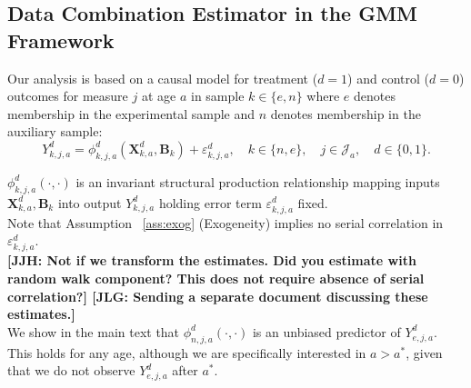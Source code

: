


\usepackage[stable]{footmisc}

\newcommand*\leftright[2]{%
  \leavevmode
  \rlap{#1}%
  \hspace{0.5\linewidth}%
  #2}

\newcommand{\orth}{\ensuremath{\perp\!\!\!\perp}}%
\newcommand{\indep}{\orth}%
\newcommand{\notorth}{\ensuremath{\perp\!\!\!\!\!\!\diagup\!\!\!\!\!\!\perp}}%
\newcommand{\notindep}{\notorth}







\doublespacing

\subsection{Data Combination Estimator in the GMM Framework} \label{appendix:gmm}

\noindent Our analysis is based on a causal model for treatment ($d=1$) and control ($d=0$) outcomes for measure $j$ at age $a$ in sample $k \in \{e,n\}$ where $e$ denotes membership in the experimental sample and $n$ denotes membership in the auxiliary sample:\\

\begin{equation}\label{eq:outcome}
Y^d_{k,j,a} = \phi^d_{k,j,a} (\bm{X}^d_{k,a}, \bm{B}_k) + \varepsilon^d_{k,j,a}, \quad k \in \{n,e\}, \quad j \in \mathcal{J}_a, \quad d \in \{0, 1\}. 
\end{equation}

\noindent $\phi^d_{k,j,a}\left( \cdot, \cdot \right)$ is an invariant structural production relationship mapping inputs $\bm{X}^d_{k,a}, \bm{B}_k$ into output $Y^d_{k,j,a}$ holding error term $\varepsilon^d_{k,j,a}$ fixed.\\

\noindent Note that Assumption ~\ref{ass:exog} (Exogeneity) implies no serial correlation in $ \varepsilon^d_{k,j,a}$.\\

\noindent \textbf{[JJH: Not if we transform the estimates. Did you estimate with random walk component? This does not require absence of serial correlation?] [JLG: Sending a separate document discussing these estimates.]}\\


\noindent We show in the main text that $\phi^d_{n,j,a} (\cdot, \cdot)$ is an unbiased predictor of $Y_{e,j,a}^d$. This holds for any age, although we are specifically interested in $a > a^*$, given that we do not observe $Y_{e,j,a}^d$ after $a^*$.\\

